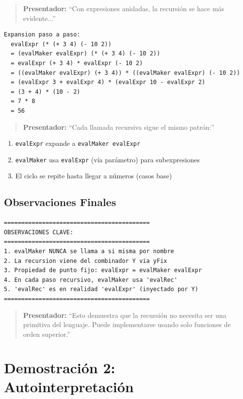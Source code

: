 \documentclass[12pt]{article}
\begin{document}
\begin{quote}
\textbf{Presentador:} ``Con expresiones anidadas, la recursión se hace más evidente...''
\end{quote}

\begin{verbatim}
Expansion paso a paso:
  evalExpr (* (+ 3 4) (- 10 2))
  = (evalMaker evalExpr) (* (+ 3 4) (- 10 2))
  = evalExpr (+ 3 4) * evalExpr (- 10 2)
  = ((evalMaker evalExpr) (+ 3 4)) * ((evalMaker evalExpr) (- 10 2))
  = (evalExpr 3 + evalExpr 4) * (evalExpr 10 - evalExpr 2)
  = (3 + 4) * (10 - 2)
  = 7 * 8
  = 56
\end{verbatim}

\begin{quote}
\textbf{Presentador:} ``Cada llamada recursiva sigue el mismo patrón:''
\end{quote}

\begin{enumerate}
\item \texttt{evalExpr} expande a \texttt{evalMaker evalExpr}
\item \texttt{evalMaker} usa \texttt{evalExpr} (vía parámetro) para subexpresiones
\item El ciclo se repite hasta llegar a números (casos base)
\end{enumerate}

\subsection*{Observaciones Finales}

\begin{verbatim}
==========================================
OBSERVACIONES CLAVE:
==========================================
1. evalMaker NUNCA se llama a si misma por nombre
2. La recursion viene del combinador Y via yFix
3. Propiedad de punto fijo: evalExpr = evalMaker evalExpr
4. En cada paso recursivo, evalMaker usa 'evalRec'
5. 'evalRec' es en realidad 'evalExpr' (inyectado por Y)
==========================================
\end{verbatim}

\begin{quote}
\textbf{Presentador:} ``Esto demuestra que la recursión no necesita ser una primitiva del lenguaje. Puede implementarse usando solo funciones de orden superior.''
\end{quote}

\newpage
\section{Demostración 2: Autointerpretación}
\end{document}

